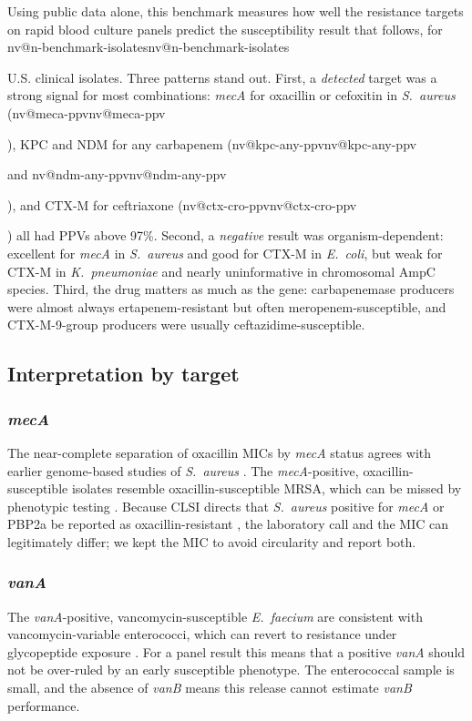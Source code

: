 \documentclass[10pt,twocolumn,letterpaper]{article}
\makeatletter
\newcommand{\nv}[1]{\ifcsname nv@#1\endcsname\csname nv@#1\endcsname\else
  \PackageError{numbers}{Unknown number key: #1}{Run build_assets.py}\fi}
\newcommand{\g}[1]{\textit{#1}}  %
\newcommand{\sau}{\textit{S.~aureus}}
\newcommand{\eco}{\textit{E.~coli}}
\newcommand{\kpn}{\textit{K.~pneumoniae}}
\makeatother
\begin{document}
Using public data alone, this benchmark measures how well the resistance targets on rapid blood culture panels predict
the susceptibility result that follows, for \nv{n-benchmark-isolates} U.S. clinical isolates. Three patterns stand out.
First, a \emph{detected} target was a strong signal for most combinations: \g{mecA} for oxacillin or cefoxitin in \sau{}
(\nv{meca-ppv}), KPC and NDM for any carbapenem (\nv{kpc-any-ppv} and \nv{ndm-any-ppv}), and CTX-M for ceftriaxone
(\nv{ctx-cro-ppv}) all had PPVs above 97\%. Second, a \emph{negative} result was organism-dependent:
excellent for \g{mecA} in \sau{} and good for CTX-M in \eco{}, but weak for CTX-M in \kpn{} and nearly uninformative in
chromosomal AmpC species. Third, the drug matters as much as the gene: carbapenemase producers were almost always
ertapenem-resistant but often meropenem-susceptible, and CTX-M-9-group producers were usually ceftazidime-susceptible.

\subsection{Interpretation by target}

\subsubsection{\g{mecA}}
The near-complete separation of oxacillin MICs by \g{mecA} status agrees with earlier genome-based studies of \sau{}
\cite{gordon2014}. The \g{mecA}-positive, oxacillin-susceptible isolates resemble oxacillin-susceptible MRSA, which can be
missed by phenotypic testing \cite{osmrsa2002}. Because CLSI directs that \sau{} positive for \g{mecA} or PBP2a be reported
as oxacillin-resistant \cite{clsi2025}, the laboratory call and the MIC can legitimately differ; we kept the MIC to avoid
circularity and report both.

\subsubsection{\g{vanA}}
The \g{vanA}-positive, vancomycin-susceptible \textit{E.~faecium} are consistent with vancomycin-variable enterococci,
which can revert to resistance under glycopeptide exposure \cite{szakacs2014,vanA2025}. For a panel result this means
that a positive \g{vanA} should not be over-ruled by an early susceptible phenotype. The enterococcal sample is small, and
the absence of \g{vanB} means this release cannot estimate \g{vanB} performance.
\end{document}
